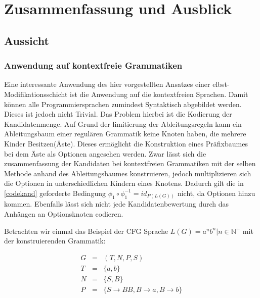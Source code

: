 \documentclass[a4paper,12pt]{report}
\begin{document}
\listoftodos[Aufgaben]




\section{Zusammenfassung und Ausblick}

\subsection*{Aussicht}

\subsubsection*{Anwendung auf kontextfreie Grammatiken}

Eine interessante Anwendung des hier vorgestellten Ansatzes einer elbst-Modifikationsschicht ist die Anwendung auf die kontextfreien Sprachen. Damit können alle Programmiersprachen zumindest Syntaktisch abgebildet werden. Dieses ist jedoch nicht Trivial. Das Problem hierbei ist die Kodierung der Kandidatenmenge. Auf Grund der limitierung der Ableitungsregeln kann ein Ableitungsbaum einer regulären Grammatik keine Knoten haben, die mehrere Kinder Besitzen(Äste). Dieses ermöglicht die Konstruktion eines Präfixbaumes bei dem Äste als Optionen angesehen werden. 
Zwar lässt sich die zusammenfassung der Kandidaten bei kontextfreien Grammatiken mit der selben Methode anhand des Ableitungsbaumes konstruieren, jedoch multiplizieren sich die Optionen in unterschiedlichen Kindern eines Knotens. Dadurch gilt die in \ref{codekand} geforderte Bedingung $\phi_1\circ\phi_1^{-1} = id_{P(L(G))}$ nicht, da Optionen hinzu kommen. Ebenfalls lässt sich nicht jede Kandidatenbewertung durch das Anhängen an Optionsknoten codieren.

Betrachten wir einmal das Beispiel der CFG Sprache $L(G) = { a^nb^n | n\in\mathbb{N}^+ }$ mit der konstruierenden Grammatik: 

\begin{eqnarray}
  G &=& (T,N,P,S)\\
  T &=& \{ a, b \}\\
  N &=& \{ S, B \} \\
  P &=& \{ S\rightarrow BB, B\rightarrow a, B\rightarrow b\}
\end{eqnarray}
\end{document}
